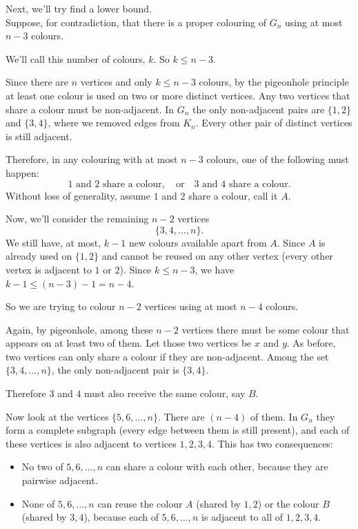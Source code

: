 \documentclass[a4paper,11pt]{report}
\begin{document}
\bigskip
Next, we'll try find a lower bound.\\
Suppose, for contradiction, that there is a proper colouring of $G_n$ using at most $n-3$ colours.

We'll call this number of colours, $k$. So $k \le n-3$.

\medskip
Since there are $n$ vertices and only $k \le n-3$ colours, by the pigeonhole principle at least one colour is used on two or more distinct vertices. Any two vertices that share a colour must be non-adjacent. In $G_n$ the only non-adjacent pairs are $\{1,2\}$ and $\{3,4\}$, where we removed edges from $K_n$. Every other pair of distinct vertices is still adjacent.

\medskip
Therefore, in any colouring with at most $n-3$ colours, one of the following must happen:
\[
1 \text{ and } 2 \text{ share a colour}, \quad \text{or} \quad 3 \text{ and } 4 \text{ share a colour}.
\]
Without loss of generality, assume $1$ and $2$ share a colour, call it $A$.

\medskip
Now, we'll consider the remaining $n-2$ vertices
\[
  \{3,4,\dots,n\}.
\]
We still have, at most, $k-1$ new colours available apart from $A$. Since $A$ is already used on $\{1,2\}$ and cannot be reused on any other vertex (every other vertex is adjacent to $1$ or $2$). Since $k \le n-3$, we have $k-1 \le (n-3)-1 = n-4$.

So we are trying to colour $n-2$ vertices using at most $n-4$ colours.

Again, by pigeonhole, among these $n-2$ vertices there must be some colour that appears on at least two of them. Let those two vertices be $x$ and $y$. As before, two vertices can only share a colour if they are non-adjacent. Among the set $\{3,4,\dots,n\}$, the only non-adjacent pair is $\{3,4\}$.

Therefore $3$ and $4$ must also receive the same colour, say $B$.

\medskip
Now look at the vertices $\{5,6,\dots,n\}$. There are $(n-4)$ of them. In $G_n$ they form a complete subgraph (every edge between them is still present), and each of these vertices is also adjacent to vertices $1,2,3,4$. This has two consequences:

\begin{itemize}
    \item No two of $5,6,\dots,n$ can share a colour with each other, because they are pairwise adjacent.
    \item None of $5,6,\dots,n$ can reuse the colour $A$ (shared by $1,2$) or the colour $B$ (shared by $3,4$), because each of $5,6,\dots,n$ is adjacent to all of $1,2,3,4$.
\end{itemize}
\end{document}
